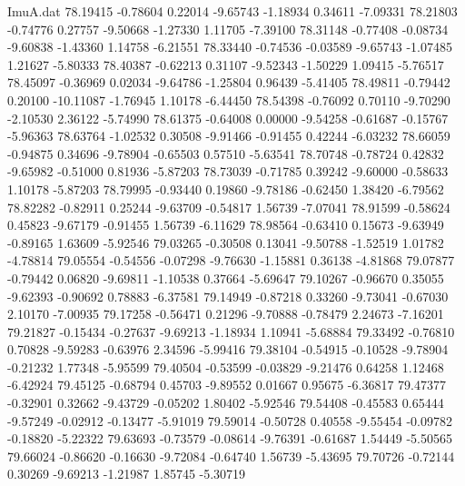 \begin{filecontents}{ImuA.dat}
  78.19415   -0.78604    0.22014   -9.65743   -1.18934    0.34611   -7.09331
  78.21803   -0.74776    0.27757   -9.50668   -1.27330    1.11705   -7.39100
  78.31148   -0.77408   -0.08734   -9.60838   -1.43360    1.14758   -6.21551
  78.33440   -0.74536   -0.03589   -9.65743   -1.07485    1.21627   -5.80333
  78.40387   -0.62213    0.31107   -9.52343   -1.50229    1.09415   -5.76517
  78.45097   -0.36969    0.02034   -9.64786   -1.25804    0.96439   -5.41405
  78.49811   -0.79442    0.20100  -10.11087   -1.76945    1.10178   -6.44450
  78.54398   -0.76092    0.70110   -9.70290   -2.10530    2.36122   -5.74990
  78.61375   -0.64008    0.00000   -9.54258   -0.61687   -0.15767   -5.96363
  78.63764   -1.02532    0.30508   -9.91466   -0.91455    0.42244   -6.03232
  78.66059   -0.94875    0.34696   -9.78904   -0.65503    0.57510   -5.63541
  78.70748   -0.78724    0.42832   -9.65982   -0.51000    0.81936   -5.87203
  78.73039   -0.71785    0.39242   -9.60000   -0.58633    1.10178   -5.87203
  78.79995   -0.93440    0.19860   -9.78186   -0.62450    1.38420   -6.79562
  78.82282   -0.82911    0.25244   -9.63709   -0.54817    1.56739   -7.07041
  78.91599   -0.58624    0.45823   -9.67179   -0.91455    1.56739   -6.11629
  78.98564   -0.63410    0.15673   -9.63949   -0.89165    1.63609   -5.92546
  79.03265   -0.30508    0.13041   -9.50788   -1.52519    1.01782   -4.78814
  79.05554   -0.54556   -0.07298   -9.76630   -1.15881    0.36138   -4.81868
  79.07877   -0.79442    0.06820   -9.69811   -1.10538    0.37664   -5.69647
  79.10267   -0.96670    0.35055   -9.62393   -0.90692    0.78883   -6.37581
  79.14949   -0.87218    0.33260   -9.73041   -0.67030    2.10170   -7.00935
  79.17258   -0.56471    0.21296   -9.70888   -0.78479    2.24673   -7.16201
  79.21827   -0.15434   -0.27637   -9.69213   -1.18934    1.10941   -5.68884
  79.33492   -0.76810    0.70828   -9.59283   -0.63976    2.34596   -5.99416
  79.38104   -0.54915   -0.10528   -9.78904   -0.21232    1.77348   -5.95599
  79.40504   -0.53599   -0.03829   -9.21476    0.64258    1.12468   -6.42924
  79.45125   -0.68794    0.45703   -9.89552    0.01667    0.95675   -6.36817
  79.47377   -0.32901    0.32662   -9.43729   -0.05202    1.80402   -5.92546
  79.54408   -0.45583    0.65444   -9.57249   -0.02912   -0.13477   -5.91019
  79.59014   -0.50728    0.40558   -9.55454   -0.09782   -0.18820   -5.22322
  79.63693   -0.73579   -0.08614   -9.76391   -0.61687    1.54449   -5.50565
  79.66024   -0.86620   -0.16630   -9.72084   -0.64740    1.56739   -5.43695
  79.70726   -0.72144    0.30269   -9.69213   -1.21987    1.85745   -5.30719

\end{filecontents}
